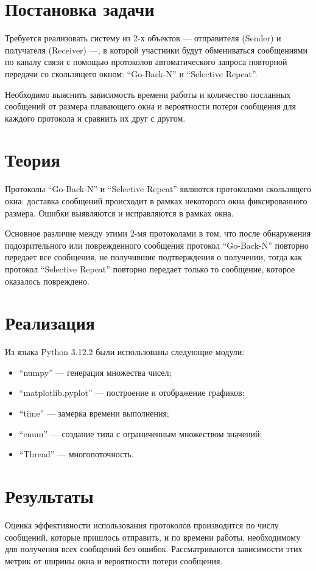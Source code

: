 \documentclass[a4paper,12pt]{article}
\newcommand{\GoBackN}{``Go-Back-N''}
\newcommand{\SelectiveRepeat}{``Selective Repeat''}
\begin{document}

\newpage

\tableofcontents
\listoffigures
\newpage

\section{Постановка задачи}
\quad Требуется реализовать систему из 2-х объектов --- отправителя (Sender) и
получателя (Receiver) ---, в которой участники будут обмениваться сообщениями по
каналу связи с помощью протоколов автоматического запроса повторной передачи со
скользящего окном: {\GoBackN} и {\SelectiveRepeat}.

\quad Необходимо выяснить зависимость времени работы и количество посланных
сообщений от размера плавающего окна и вероятности потери сообщения для каждого
протокола и сравнить их друг с другом.

\section{Теория}
\quad Протоколы {\GoBackN} и {\SelectiveRepeat} являются протоколами скользящего
окна: доставка сообщений происходит в рамках некоторого окна фиксированного
размера. Ошибки выявляются и исправляются в рамках окна.

\quad Основное различие между этими 2-мя протоколами в том, что после
обнаружения подозрительного или поврежденного сообщения протокол {\GoBackN}
повторно передает все сообщения, не получившие подтверждения о получении, тогда
как протокол {\SelectiveRepeat} повторно передает только то сообщение, которое
оказалось повреждено.

\section{Реализация}
\quad Из языка Python 3.12.2 были использованы следующие модули:
\begin{itemize}
  \item ``numpy'' --- генерация множества чисел;
  \item ``matplotlib.pyplot'' --- построение и отображение графиков;
  \item ``time'' --- замерка времени выполнения;
  \item ``enum'' --- создание типа с ограниченным множеством значений;
  \item ``Thread'' --- многопоточность.
\end{itemize}

\section{Результаты}
\quad Оценка эффективности использования протоколов производится по числу
сообщений, которые пришлось отправить, и по времени работы, необходимому для
получения всех сообщений без ошибок. Рассматриваются зависимости этих метрик от
ширины окна и вероятности потери сообщения.
\end{document}
